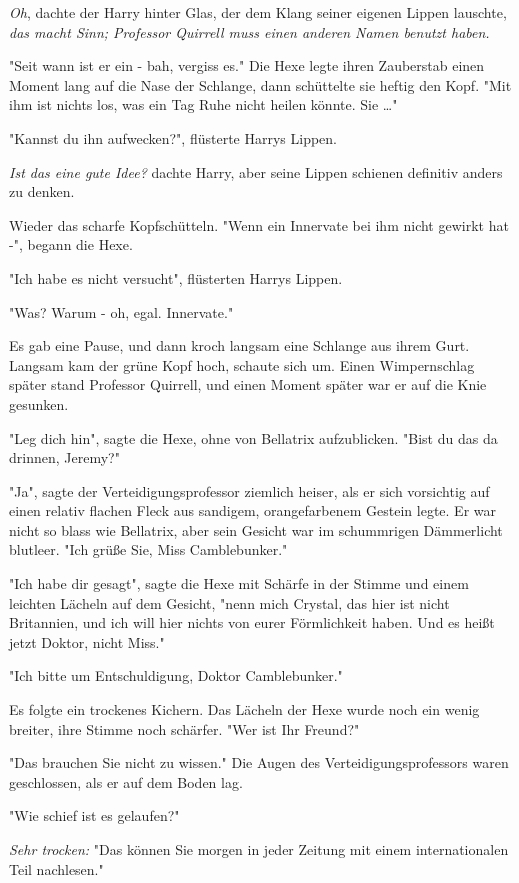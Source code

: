 {\emph{Oh}, dachte der Harry hinter Glas, der dem Klang seiner eigenen Lippen lauschte, \emph{das macht Sinn; Professor Quirrell muss einen anderen Namen benutzt haben.}

"Seit wann ist er ein - bah, vergiss es." Die Hexe legte ihren Zauberstab einen Moment lang auf die Nase der Schlange, dann schüttelte sie heftig den Kopf. "Mit ihm ist nichts los, was ein Tag Ruhe nicht heilen könnte. Sie …"

"Kannst du ihn aufwecken?", flüsterte Harrys Lippen.

\emph{Ist das eine gute Idee?} dachte Harry, aber seine Lippen schienen definitiv anders zu denken.

Wieder das scharfe Kopfschütteln. "Wenn ein Innervate bei ihm nicht gewirkt hat -", begann die Hexe.

"Ich habe es nicht versucht", flüsterten Harrys Lippen.

"Was? Warum - oh, egal. Innervate."

Es gab eine Pause, und dann kroch langsam eine Schlange aus ihrem Gurt. Langsam kam der grüne Kopf hoch, schaute sich um. Einen Wimpernschlag später stand Professor Quirrell, und einen Moment später war er auf die Knie gesunken.

"Leg dich hin", sagte die Hexe, ohne von Bellatrix aufzublicken. "Bist du das da drinnen, Jeremy?"

"Ja", sagte der Verteidigungsprofessor ziemlich heiser, als er sich vorsichtig auf einen relativ flachen Fleck aus sandigem, orangefarbenem Gestein legte. Er war nicht so blass wie Bellatrix, aber sein Gesicht war im schummrigen Dämmerlicht blutleer. "Ich grüße Sie, Miss Camblebunker."

"Ich habe dir gesagt", sagte die Hexe mit Schärfe in der Stimme und einem leichten Lächeln auf dem Gesicht, "nenn mich Crystal, das hier ist nicht Britannien, und ich will hier nichts von eurer Förmlichkeit haben. Und es heißt jetzt Doktor, nicht Miss."

"Ich bitte um Entschuldigung, Doktor Camblebunker."

Es folgte ein trockenes Kichern. Das Lächeln der Hexe wurde noch ein wenig breiter, ihre Stimme noch schärfer. "Wer ist Ihr Freund?"

"Das brauchen Sie nicht zu wissen." Die Augen des Verteidigungsprofessors waren geschlossen, als er auf dem Boden lag.

"Wie schief ist es gelaufen?"

\emph{Sehr trocken:} "Das können Sie morgen in jeder Zeitung mit einem internationalen Teil nachlesen."

}
